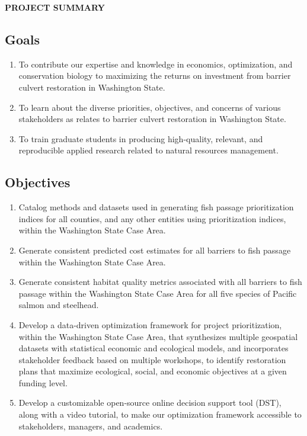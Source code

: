 \documentclass[12pt]{elsarticle}
\begin{document}
	
	\begin{center} \textbf{PROJECT SUMMARY} \end{center}
	
		\subsection*{Goals}
			\begin{enumerate}
				\item To contribute our expertise and knowledge in economics, optimization, and conservation biology to maximizing the returns on investment from barrier culvert restoration in Washington State.
				\item To learn about the diverse priorities, objectives, and concerns of various stakeholders as relates to barrier culvert restoration in Washington State.
				\item To train graduate students in producing high-quality, relevant, and reproducible applied research related to natural resources management.
			\end{enumerate}
		
		\subsection*{Objectives}
			\begin{enumerate}
				\item Catalog methods and datasets used in generating fish passage prioritization indices for all counties, and any other entities using prioritization indices, within the Washington State Case Area. 
				\item Generate consistent predicted cost estimates for all barriers to fish passage within the Washington State Case Area. 
				\item Generate consistent habitat quality metrics associated with all barriers to fish passage within the Washington State Case Area for all five species of Pacific salmon and steelhead.
				\item Develop a data-driven optimization framework for project prioritization, within the Washington State Case Area, that synthesizes multiple geospatial datasets with statistical economic and ecological models, and incorporates stakeholder feedback based on multiple workshops, to identify restoration plans that maximize ecological, social, and economic objectives at a given funding level.
				\item Develop a customizable open-source online decision support tool (DST), along with a video tutorial, to make our optimization framework accessible to stakeholders, managers, and academics. 
			\end{enumerate}
			
\end{document}
